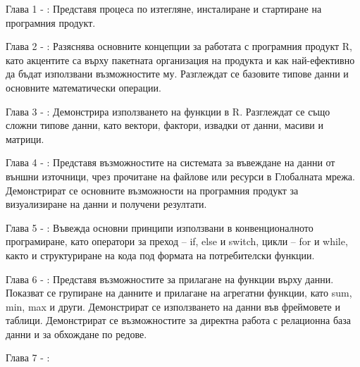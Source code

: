 Глава 1 - : Представя процеса по изтегляне, инсталиране и стартиране на програмния продукт.

Глава 2 - : Разяснява основните концепции за работата с програмния продукт R, като акцентите са върху пакетната организация на продукта и как най-ефективно да бъдат използвани възможностите му. Разглеждат се базовите типове данни и основните математически операции. 

Глава 3 - : Демонстрира използването на функции в R. Разглеждат се също сложни типове данни, като вектори, фактори, извадки от данни, масиви и матрици. 

Глава 4 - : Представя възможностите на системата за въвеждане на данни от външни източници, чрез прочитане на файлове или ресурси в Глобалната мрежа. Демонстрират се основните възможности на програмния продукт за визуализиране на данни и получени резултати.  

Глава 5 - : Въвежда основни принципи използвани в конвенционалното програмиране, като оператори за преход – if, else и switch, цикли – for и while, както и структуриране на кода под формата на потребителски функции.

Глава 6 - : Представя възможностите за прилагане на функции върху данни. Показват се групиране на данните и прилагане на агрегатни функции, като sum, min, max и други. Демонстрират се използването на данни във фреймовете и таблици. Демонстрират се възможностите за директна работа с релационна база данни и за обхождане по редове.

Глава 7 - : 

